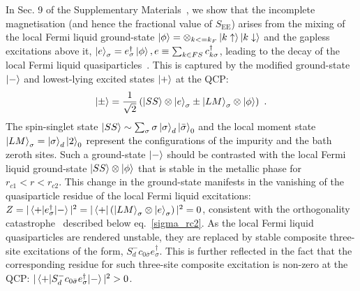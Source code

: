 \documentclass{iopart}
\begin{document}
In Sec. 9 of the Supplementary Materials~\cite{supp_mat}, we show that the incomplete magnetisation (and hence the fractional value of \(S_\text{EE}\)) arises from the mixing of the local Fermi liquid ground-state \(\ket{\phi} = \otimes_{k <= k_F} \ket{k \uparrow}\ket{k \downarrow}\) and the gapless excitations above it, \(\ket{e}_\sigma = e^\dagger_\sigma \ket{\phi}, e \equiv \sum_{k \in FS} c^\dagger_{k\sigma}\), leading to the decay of the local Fermi liquid quasiparticles~\cite{varma2002singular}. This is captured by the modified ground-state \(\ket{-}\) and lowest-lying excited states \(\ket{+}\) at the QCP:
\begin{eqnarray}\label{new-ground-state}
	\ket{\pm} = \frac{1}{\sqrt 2}\left(\ket{SS}\otimes\ket{e}_\sigma \pm \ket{LM}_\sigma\otimes\ket{\phi}\right)~.
\end{eqnarray}
The spin-singlet state \(\ket{SS} \sim \sum_\sigma \sigma\ket{\sigma}_d\ket{\bar\sigma}_0\) and the local moment state \(\ket{LM}_\sigma = \ket{\sigma}_d \ket{2}_0\) represent the configurations of the impurity and the bath zeroth sites. Such a ground-state \(\ket{-}\) should be contrasted with the local Fermi liquid ground-state \(\ket{SS}\otimes\ket{\phi}\) that is stable in the metallic phase for \(r_{c1} < r < r_{c2}\). This change in the ground-state manifests in the vanishing of the quasiparticle residue of the local Fermi liquid excitations: \(Z = |\braket{+ | e^\dagger_{\sigma} | -}|^2 = |\bra{+} \left(\ket{LM}_\sigma\otimes \ket{e}_\sigma\right)|^2 = 0\), consistent with the orthogonality catastrophe~\cite{anderson1967infrared} described below eq.~\eqref{sigma_rc2}.
As the local Fermi liquid quasiparticles are rendered unstable, they are replaced by stable composite three-site excitations of the form, \(S_d^- c_{0 \bar\sigma} e^\dagger_\sigma\). This is further reflected in the fact that the corresponding residue for such three-site composite excitation is non-zero at the QCP: \(|\braket{+|S_d^- c_{0 \bar\sigma} e^\dagger_\sigma|-}|^2 > 0\).
\end{document}
